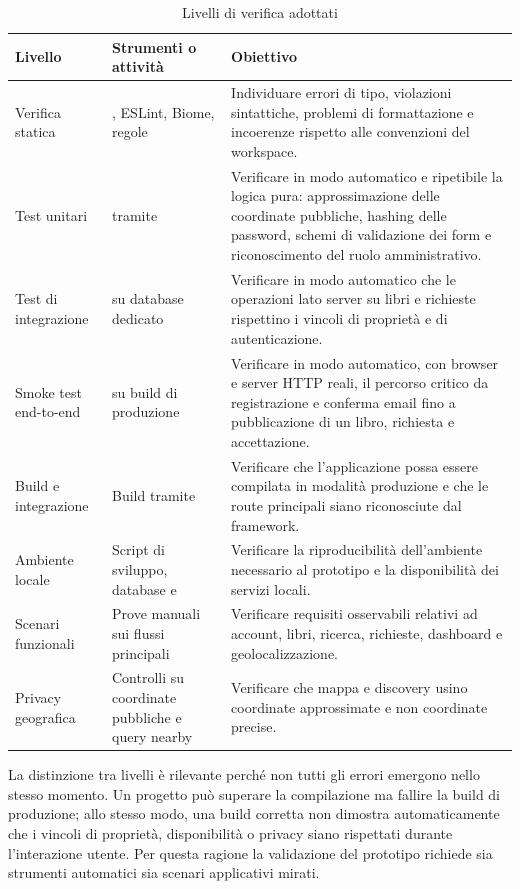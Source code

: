 \begin{table}[H]
    \centering
    \caption{Livelli di verifica adottati}
    \label{tab:livelli-verifica}
    \small
    \begin{tabularx}{\textwidth}{p{}p{}X}
        \toprule
        \textbf{Livello} & \textbf{Strumenti o attività} & \textbf{Obiettivo} \\
        \midrule
        Verifica statica & \typescript{}, ESLint, Biome, regole \nx{} & Individuare errori di tipo, violazioni sintattiche, problemi di formattazione e incoerenze rispetto alle convenzioni del workspace. \\
        Test unitari & \vitest{} tramite \nx{} & Verificare in modo automatico e ripetibile la logica pura: approssimazione delle coordinate pubbliche, hashing delle password, schemi di validazione dei form e riconoscimento del ruolo amministrativo. \\
        Test di integrazione & \vitest{} su database \postgresql{} dedicato & Verificare in modo automatico che le operazioni lato server su libri e richieste rispettino i vincoli di proprietà e di autenticazione. \\
        Smoke test end-to-end & \playwright{} su build di produzione & Verificare in modo automatico, con browser e server HTTP reali, il percorso critico da registrazione e conferma email fino a pubblicazione di un libro, richiesta e accettazione. \\
        Build e integrazione & Build \nextjs{} tramite \nx{} & Verificare che l'applicazione possa essere compilata in modalità produzione e che le route principali siano riconosciute dal framework. \\
        Ambiente locale & Script di sviluppo, database \postgresql{} e \postgis{} & Verificare la riproducibilità dell'ambiente necessario al prototipo e la disponibilità dei servizi locali. \\
        Scenari funzionali & Prove manuali sui flussi principali & Verificare requisiti osservabili relativi ad account, libri, ricerca, richieste, dashboard e geolocalizzazione. \\
        Privacy geografica & Controlli su coordinate pubbliche e query nearby & Verificare che mappa e discovery usino coordinate approssimate e non coordinate precise. \\
        \bottomrule
    \end{tabularx}
\end{table}

La distinzione tra livelli è rilevante perché non tutti gli errori emergono nello stesso momento. Un progetto può superare la compilazione \typescript{} ma fallire la build di produzione; allo stesso modo, una build corretta non dimostra automaticamente che i vincoli di proprietà, disponibilità o privacy siano rispettati durante l'interazione utente. Per questa ragione la validazione del prototipo richiede sia strumenti automatici sia scenari applicativi mirati.

